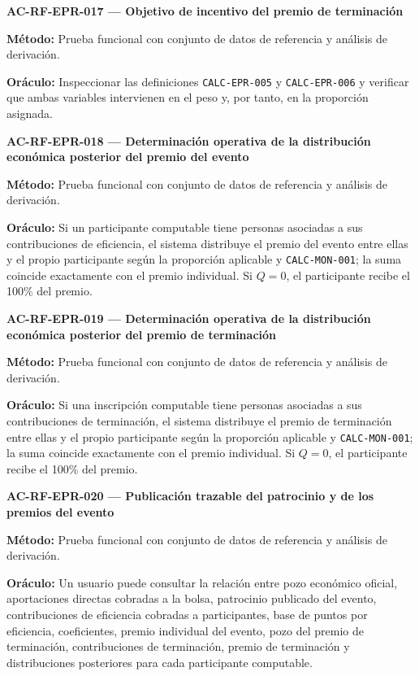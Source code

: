 \documentclass[10pt,letterpaper]{article}
\begin{document}
\noindent\textbf{AC-RF-EPR-017 --- Objetivo de incentivo del premio de terminación}\par
\textbf{Método:} Prueba funcional con conjunto de datos de referencia y análisis de derivación.\par
\textbf{Oráculo:} Inspeccionar las definiciones \texttt{CALC-EPR-005} y \texttt{CALC-EPR-006} y verificar que ambas variables intervienen en el peso y, por tanto, en la proporción asignada.\par\vspace{0.45em}
\noindent\textbf{AC-RF-EPR-018 --- Determinación operativa de la distribución económica posterior del premio del evento}\par
\textbf{Método:} Prueba funcional con conjunto de datos de referencia y análisis de derivación.\par
\textbf{Oráculo:} Si un participante computable tiene personas asociadas a sus contribuciones de eficiencia, el sistema distribuye el premio del evento entre ellas y el propio participante según la proporción aplicable y \texttt{CALC-MON-001}; la suma coincide exactamente con el premio individual. Si $Q=0$, el participante recibe el 100\% del premio.\par\vspace{0.45em}
\noindent\textbf{AC-RF-EPR-019 --- Determinación operativa de la distribución económica posterior del premio de terminación}\par
\textbf{Método:} Prueba funcional con conjunto de datos de referencia y análisis de derivación.\par
\textbf{Oráculo:} Si una inscripción computable tiene personas asociadas a sus contribuciones de terminación, el sistema distribuye el premio de terminación entre ellas y el propio participante según la proporción aplicable y \texttt{CALC-MON-001}; la suma coincide exactamente con el premio individual. Si $Q=0$, el participante recibe el 100\% del premio.\par\vspace{0.45em}
\noindent\textbf{AC-RF-EPR-020 --- Publicación trazable del patrocinio y de los premios del evento}\par
\textbf{Método:} Prueba funcional con conjunto de datos de referencia y análisis de derivación.\par
\textbf{Oráculo:} Un usuario puede consultar la relación entre pozo económico oficial, aportaciones directas cobradas a la bolsa, patrocinio publicado del evento, contribuciones de eficiencia cobradas a participantes, base de puntos por eficiencia, coeficientes, premio individual del evento, pozo del premio de terminación, contribuciones de terminación, premio de terminación y distribuciones posteriores para cada participante computable.\par\vspace{0.45em}
\end{document}
